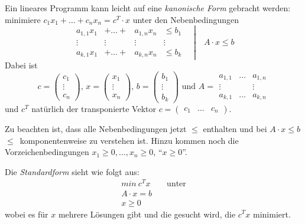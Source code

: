 Ein lineares Programm kann leicht auf eine \textit{kanonische Form} gebracht werden: minimiere $c_1 x_1 + \ldots + c_n x_n = c^T \cdot x$ unter den Nebenbedingungen
\[ \left.\begin{matrix} a_{1,1} x_1 &+ \ldots +& a_{1,n} x_n &\le b_1 \\ \vdots & \vdots & \vdots & \vdots \\ a_{k,1} x_1 &+ \ldots +& a_{k,n} x_n &\le b_k\end{matrix}\quad\right|\quad A \cdot x \le b \]
Dabei ist
\[ c = \begin{pmatrix}c_1 \\ \vdots \\ c_n\end{pmatrix} \text{, } x = \begin{pmatrix}x_1 \\ \vdots \\ x_n\end{pmatrix}  \text{, } b = \begin{pmatrix}b_1 \\ \vdots \\ b_k\end{pmatrix} \text{ und }  A = \begin{matrix}a_{1,1} &\ldots& a_{1,n} \\ \vdots & & \vdots \\ a_{k,1} &\ldots& a_{k,n}\end{matrix} \]
und $c^T$ natürlich der transponierte Vektor $c = \begin{pmatrix} c_1 & \ldots & c_n\end{pmatrix}$.

Zu beachten ist, dass alle Nebenbedingungen jetzt $\le$ enthalten und bei $A \cdot x \le b$ $\le$~komponentenweise zu verstehen ist. Hinzu kommen noch die Vorzeichenbedingungen $x_1 \ge 0, \ldots, x_n \ge 0$, "`$x \ge 0$"'.

Die \textit{Standardform} sieht wie folgt aus:
\begin{align*}
  min~c^T x &\quad \text{unter}\\
  A \cdot x = b \\
  x \ge 0
\end{align*}
wobei es für $x$ mehrere Lösungen gibt und die gesucht wird, die $c^T x$ minimiert.

